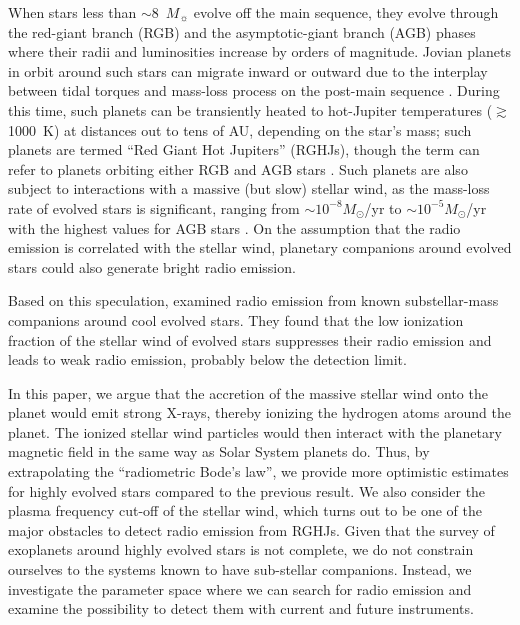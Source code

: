 \documentclass[iop,numberedappendix,apj]{emulateapj}
\begin{document}
When stars less than $\sim$8~$M_\sun$ evolve off the main sequence, they evolve through the red-giant branch (RGB) and the asymptotic-giant branch (AGB) phases where their radii and luminosities increase by orders of magnitude.
Jovian planets in orbit around such stars can migrate inward or outward due to the interplay between tidal torques and mass-loss process on the post-main sequence \citep{nordhaus_et_al2010,nordhaus+spiegel2013}.  During this time, such planets can be transiently heated to hot-Jupiter temperatures ($\gtrsim$1000~K) at distances out to tens of AU, depending on the star's mass; such planets are termed ``Red Giant Hot Jupiters'' (RGHJs), though the term can refer to planets orbiting either RGB and AGB stars \citep{spiegel+madhusudhan2012}.
Such planets are also subject to interactions with a massive (but slow) stellar wind, as the mass-loss rate of evolved stars is significant, ranging from $\sim 10^{-8} M_\odot$/yr to $\sim  10^{-5} M_\odot$/yr with the highest values for AGB stars \citep[e.g.,][]{reimers1975, schild1989, vassiliadis1993, schoier2001, vanloon2005}. 
On the assumption that the radio emission is correlated with the stellar wind, planetary companions around evolved stars could also generate bright radio emission. 

Based on this speculation, \citet{ignace2010} examined radio emission from known substellar-mass companions around cool evolved stars.
They found that the low ionization fraction of the stellar wind of evolved stars suppresses their radio emission and leads to weak radio emission, probably below the detection limit. 

In this paper, we argue that the accretion of the massive stellar wind onto the planet would emit strong X-rays, thereby ionizing the hydrogen atoms around the planet.
The ionized stellar wind particles would then interact with the planetary magnetic field in the same way as Solar System planets do.
Thus, by extrapolating the ``radiometric Bode's law'', we provide more optimistic estimates for highly evolved stars compared to the previous result.
We also consider the plasma frequency cut-off of the stellar wind, which turns out to be one of the major obstacles to detect radio emission from RGHJs. 
Given that the survey of exoplanets around highly evolved stars is not complete, we do not constrain ourselves to the systems known to have sub-stellar companions.
Instead, we investigate the parameter space where we can search for radio emission and examine the possibility to detect them with current and future instruments. 
\end{document}

